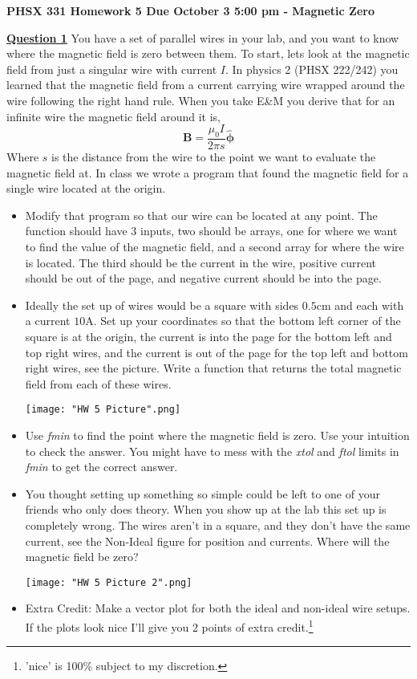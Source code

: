 \documentclass[]{letter}
\begin{document}
 
\textbf{\Large{PHSX 331 Homework 5 Due October 3 5:00 pm - Magnetic Zero}}
 
\hrulefill
 
\textbf{\underline{Question 1}} You have a set of parallel wires in your lab, and you want to know where the magnetic field is zero between them. To start, lets look at the magnetic field from just a singular wire with current $I$. In physics 2 (PHSX 222/242) you learned that the magnetic field from a current carrying wire wrapped around the wire following the right hand rule. When you take E\&M you derive that for an infinite wire the magnetic field around it is,
\begin{equation}
	\boldsymbol{B} = \frac{\mu_0 I}{2\pi s}\boldsymbol{\hat{\phi}}
\end{equation}
Where $s$ is the distance from the wire to the point we want to evaluate the magnetic field at. In class we wrote a program that found the magnetic field for a single wire located at the origin.
\begin{itemize}
	\item Modify that program so that our wire can be located at any point. The function should have 3 inputs, two should be arrays, one for where we want to find the value of the magnetic field, and a second array for where the wire is located. The third should be the current in the wire, positive current should be out of the page, and negative current should be into the page.
	\item Ideally the set up of wires would be a square with sides $0.5$cm and each with a current $10$A. Set up your coordinates so that the bottom left corner of the square is at the origin, the current is into the page for the bottom left and top right wires, and the current is out of the page for the top left and bottom right wires, see the picture. Write a function that returns the total magnetic field from each of these wires. 
	\begin{center}
		\texttt{[image: "HW 5 Picture".png]}
	\end{center}
	\item Use \textit{fmin} to find the point where the magnetic field is zero. Use your intuition to check the answer. You might have to mess with the \textit{xtol} and \textit{ftol} limits in \textit{fmin} to get the correct answer.
	\item You thought setting up something so simple could be left to one of your friends who only does theory. When you show up at the lab this set up is completely wrong. The wires aren't in a square, and they don't have the same current, see the Non-Ideal figure for position and currents. Where will the magnetic field be zero?
	\begin{center}
		\texttt{[image: "HW 5 Picture 2".png]}
	\end{center}
	\item Extra Credit: Make a vector plot for both the ideal and non-ideal wire setups. If the plots look nice I'll give you 2 points of extra credit.\footnote{'nice' is 100\% subject to my discretion.}
\end{itemize} 
 
\end{document}
